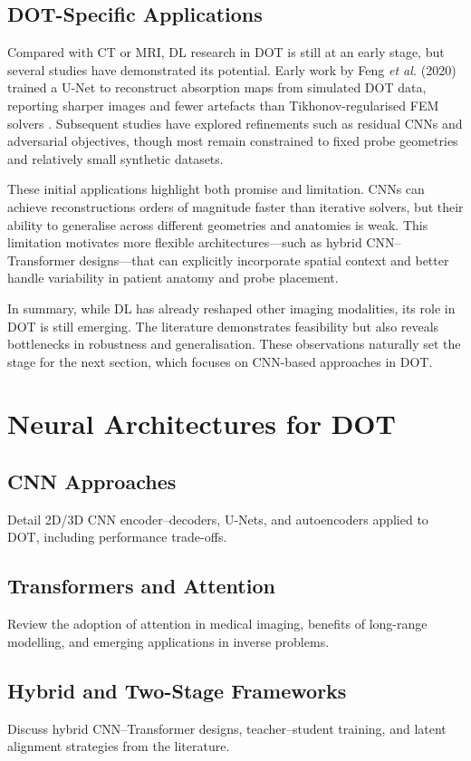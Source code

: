 \subsection{DOT-Specific Applications}
Compared with CT or MRI, DL research in DOT is still at an early stage, but several studies have demonstrated its potential. Early work by Feng \emph{et al.} (2020) trained a U-Net to reconstruct absorption maps from simulated DOT data, reporting sharper images and fewer artefacts than Tikhonov-regularised FEM solvers \cite{feng2020}. Subsequent studies have explored refinements such as residual CNNs and adversarial objectives, though most remain constrained to fixed probe geometries and relatively small synthetic datasets.  

These initial applications highlight both promise and limitation. CNNs can achieve reconstructions orders of magnitude faster than iterative solvers, but their ability to generalise across different geometries and anatomies is weak. This limitation motivates more flexible architectures—such as hybrid CNN–Transformer designs—that can explicitly incorporate spatial context and better handle variability in patient anatomy and probe placement.  

In summary, while DL has already reshaped other imaging modalities, its role in DOT is still emerging. The literature demonstrates feasibility but also reveals bottlenecks in robustness and generalisation. These observations naturally set the stage for the next section, which focuses on CNN-based approaches in DOT.





\section{Neural Architectures for DOT}
\subsection{CNN Approaches}
Detail 2D/3D CNN encoder–decoders, U-Nets, and autoencoders applied to DOT, including performance trade-offs.
\subsection{Transformers and Attention}
Review the adoption of attention in medical imaging, benefits of long-range modelling, and emerging applications in inverse problems.
\subsection{Hybrid and Two-Stage Frameworks}
Discuss hybrid CNN–Transformer designs, teacher–student training, and latent alignment strategies from the literature.

